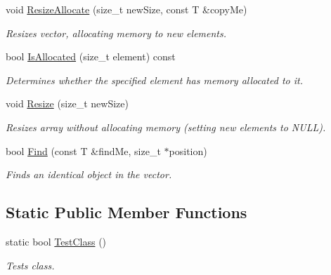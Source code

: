 \begin{DoxyCompactItemize}
void \hyperlink{class_store_vector_a92f207ccfa2e3f44124a3c5956bbfc63}{ResizeAllocate} (size\_\-t newSize, const T \&copyMe)
\begin{DoxyCompactList}\small\item\em Resizes vector, allocating memory to new elements. \item\end{DoxyCompactList}\item 
bool \hyperlink{class_store_vector_ad74fc4edf8bd17c91c208943a5a820b8}{IsAllocated} (size\_\-t element) const 
\begin{DoxyCompactList}\small\item\em Determines whether the specified element has memory allocated to it. \item\end{DoxyCompactList}\item 
void \hyperlink{class_store_vector_a039923aa715a648daa4115fd110c54d5}{Resize} (size\_\-t newSize)
\begin{DoxyCompactList}\small\item\em Resizes array without allocating memory (setting new elements to NULL). \item\end{DoxyCompactList}\item 
bool \hyperlink{class_store_vector_ac5c17dbab69c51ba929dfc93fec34119}{Find} (const T \&findMe, size\_\-t $\ast$position)
\begin{DoxyCompactList}\small\item\em Finds an identical object in the vector. \item\end{DoxyCompactList}\end{DoxyCompactItemize}
\subsection*{Static Public Member Functions}
\begin{DoxyCompactItemize}
\item 
static bool \hyperlink{class_store_vector_ac46654a34bc5c0a5f7bc4f8819314a2d}{TestClass} ()
\begin{DoxyCompactList}\small\item\em Tests class. \item\end{DoxyCompactList}\end{DoxyCompactItemize}
